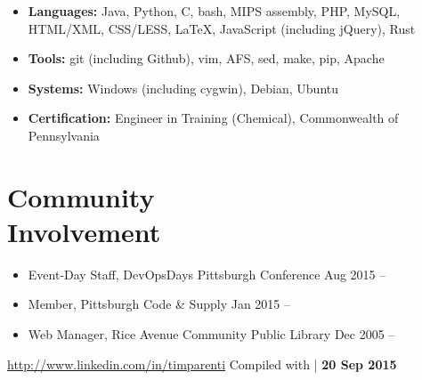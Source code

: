 \documentclass[11pt]{article}
\newcommand{\lmr}{\fontfamily{lmr}\selectfont} %
\newcommand{\present}{\phantom{Xxx 20XX}}
\newcommand{\itemizeonly}{\leavevmode\par\vspace{\dimexpr-\baselineskip-\parskip}}
\begin{document}
\itemizeonly
\begin{itemize}
	\item \textbf{Languages:} Java, Python, C, bash, MIPS assembly, PHP, MySQL, HTML/XML, CSS/LESS,
		\LaTeX, JavaScript (including jQuery), Rust
	\item \textbf{Tools:} git (including Github), vim, AFS, sed, make, pip, Apache
	\item \textbf{Systems:} Windows (including cygwin), Debian, Ubuntu
	\item \textbf{Certification:} Engineer in Training (Chemical), Commonwealth of Pennsylvania
\end{itemize}



\section{Community \\ Involvement}

\itemizeonly
\begin{itemize}
	\item Event-Day Staff, DevOpsDays Pittsburgh Conference
		\hfill Aug 2015 -- \present
	\item Member, Pittsburgh Code \& Supply
		\hfill Jan 2015 -- \present
	\item Web Manager, Rice Avenue Community Public Library
		\hfill Dec 2005 -- \present
\end{itemize}



\begin{adjustwidth}{-1in}{0pt}
  \hrulefill \par
  \hypersetup{linkcolor=gray}
  \small
  \url{http://www.linkedin.com/in/timparenti} \hfill {\lmr Compiled with \XeLaTeX} | \textbf{20 Sep 2015}
\end{adjustwidth}
\end{document}

